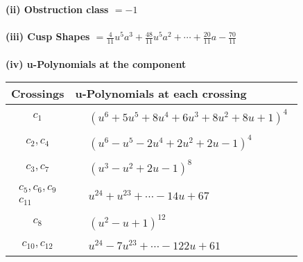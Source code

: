 \documentclass[1p]{elsarticle_modified}
\theoremstyle{definition}
\begin{document}
\flushleft \textbf{(ii) Obstruction class $= -1$}\\~\\
\flushleft \textbf{(iii) Cusp Shapes $= \frac{4}{11} u^5 a^3+\frac{48}{11} u^5 a^2+\cdots+\frac{20}{11} a-\frac{70}{11}$}\\~\\
\newpage\renewcommand{\arraystretch}{1}
\flushleft \textbf{(iv) u-Polynomials at the component}\newline \\
\begin{tabular}{m{50pt}|m{274pt}}
Crossings & \hspace{64pt}u-Polynomials at each crossing \\
\hline $$\begin{aligned}c_{1}\end{aligned}$$&$\begin{aligned}
&(u^6+5 u^5+8 u^4+6 u^3+8 u^2+8 u+1)^4
\end{aligned}$\\
\hline $$\begin{aligned}c_{2},c_{4}\end{aligned}$$&$\begin{aligned}
&(u^6- u^5-2 u^4+2 u^2+2 u-1)^4
\end{aligned}$\\
\hline $$\begin{aligned}c_{3},c_{7}\end{aligned}$$&$\begin{aligned}
&(u^3- u^2+2 u-1)^8
\end{aligned}$\\
\hline $$\begin{aligned}c_{5},c_{6},c_{9}\\c_{11}\end{aligned}$$&$\begin{aligned}
&u^{24}+u^{23}+\cdots-14 u+67
\end{aligned}$\\
\hline $$\begin{aligned}c_{8}\end{aligned}$$&$\begin{aligned}
&(u^2- u+1)^{12}
\end{aligned}$\\
\hline $$\begin{aligned}c_{10},c_{12}\end{aligned}$$&$\begin{aligned}
&u^{24}-7 u^{23}+\cdots-122 u+61
\end{aligned}$\\
\hline
\end{tabular}\\~\\
\end{document}
